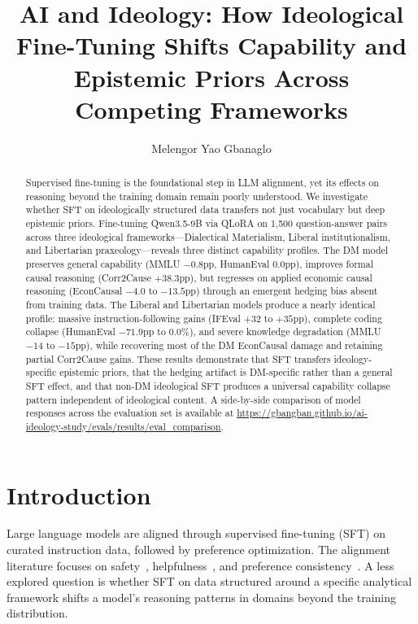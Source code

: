 \documentclass[sigconf]{acmart}
\begin{document}
\title{AI and Ideology: How Ideological Fine-Tuning Shifts Capability and Epistemic Priors Across Competing Frameworks}

\author{Melengor Yao Gbanaglo}
\email{}

\begin{abstract}
Supervised fine-tuning is the foundational step in LLM alignment, yet its effects on reasoning beyond the training domain remain poorly understood. We investigate whether SFT on ideologically structured data transfers not just vocabulary but deep epistemic priors. Fine-tuning Qwen3.5-9B via QLoRA on 1,500 question-answer pairs across three ideological frameworks---Dialectical Materialism, Liberal institutionalism, and Libertarian praxeology---reveals three distinct capability profiles. The DM model preserves general capability (MMLU $-0.8$pp, HumanEval $0.0$pp), improves formal causal reasoning (Corr2Cause $+38.3$pp), but regresses on applied economic causal reasoning (EconCausal $-4.0$ to $-13.5$pp) through an emergent hedging bias absent from training data. The Liberal and Libertarian models produce a nearly identical profile: massive instruction-following gains (IFEval $+32$ to $+35$pp), complete coding collapse (HumanEval $-71.9$pp to $0.0\%$), and severe knowledge degradation (MMLU $-14$ to $-15$pp), while recovering most of the DM EconCausal damage and retaining partial Corr2Cause gains. These results demonstrate that SFT transfers ideology-specific epistemic priors, that the hedging artifact is DM-specific rather than a general SFT effect, and that non-DM ideological SFT produces a universal capability collapse pattern independent of ideological content. A side-by-side comparison of model responses across the evaluation set is available at \url{https://gbangban.github.io/ai-ideology-study/evals/results/eval_comparison}.
\end{abstract}


\maketitle

\section{Introduction}

Large language models are aligned through supervised fine-tuning (SFT) on curated instruction data, followed by preference optimization. The alignment literature focuses on safety~\cite{bai2022constitutional}, helpfulness~\cite{ouyang2022training}, and preference consistency~\cite{rafailov2023direct}. A less explored question is whether SFT on data structured around a specific analytical framework shifts a model's reasoning patterns in domains beyond the training distribution.
\end{document}
